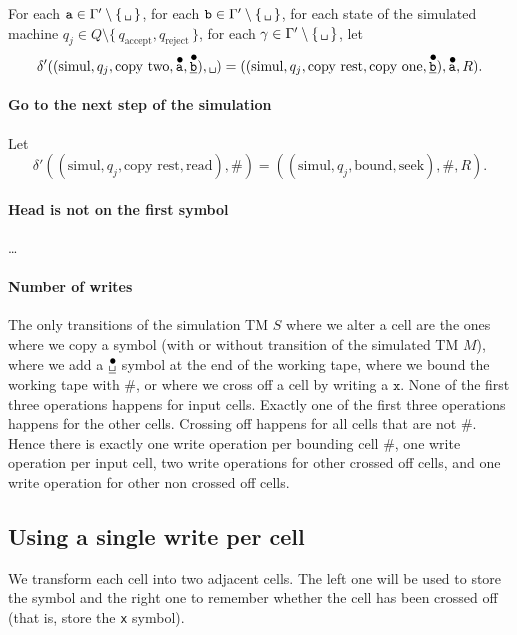 \documentclass{article}
\newcommand\obullet[1]{\ThisStyle{\ensurestackMath{%
  \stackon[1pt]{\SavedStyle#1}{\SavedStyle\kern.6\LMpt\bullet}}}}
\newcommand{\0}{\texttt{\textvisiblespace}}
\newcommand{\°}{\obullet{\0}}
\newcommand{\BB}{\obullet{\underline{\0}}}
\newcommand{\A}{\obullet{\s}}
\newcommand{\HQ}{\obullet{\underline{\w}}}
\newcommand{\s}{\texttt{a}}
\newcommand{\w}{\texttt{b}}
\newcommand{\X}{\texttt{x}}
\newcommand{\e}{\texttt{\#}}
\newcommand{\TM}{TM}
\newcommand{\qa}{q_\text{accept}}
\newcommand{\qr}{q_\text{reject}}
\newcommand{\gpwb}{\Gamma'\setminus\{\,\0{}\,\}}
\newcommand{\qwar}{Q\setminus\{\,\qa,\qr\,\}}
\begin{document}
For each $\s \in \gpwb$,
for each $\w \in \gpwb$,
for each state of the simulated machine $q_j \in \qwar$,
for each $\gamma \in\gpwb$,
let $$\delta'((\text{simul}, q_j, \text{copy two}, \A, \HQ), \0{})
= ((\text{simul}, q_j, \text{copy rest}, \text{copy one}, \HQ), \A, R).$$

\paragraph{Go to the next step of the simulation}
Let $$\delta'((\text{simul}, q_j, \text{copy rest}, \text{read}), \e)
= ((\text{simul}, q_j, \text{bound}, \text{seek}), \e, R).$$

\paragraph{Head is not on the first symbol}
\dots

\paragraph{Number of writes}
The only transitions of the simulation \TM{} $S$ where we alter a cell are the
ones where we
copy a symbol (with or without transition of the simulated \TM{} $M$), where we add a
$\BB$ symbol at the end of the working tape, where we bound the working tape
with $\e$, or where we cross off a cell by writing a $\X$.
None of the first three operations happens for input cells.
Exactly one of the first three operations happens for the other
cells.
Crossing off happens for all cells that are not $\e$. Hence there is exactly
one write operation per bounding cell $\e$,
one write operation per input cell,
two write operations for other crossed off cells,
and one write operation for other non crossed off cells.

\subsection{Using a single write per cell}

We transform each cell into two adjacent cells. The left one will be used to
store the symbol and the right one to remember whether the cell has been
crossed off (that is, store the \X{} symbol).
\end{document}
